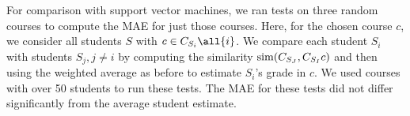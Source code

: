 For comparison with support vector machines, we ran tests on three random courses to compute the MAE for just those courses.  Here, for the chosen course $c$, we consider all students $S$ with $c \in C_{S_i} \all{i}$.  We compare each student $S_i$ with students $S_j, j \neq i$ by computing the similarity $\textrm{sim}(C_{S_J}, C_{S_I} \\ c)$ and then using the weighted average as before to estimate $S_i$'s grade in $c$.  We used courses with over 50 students to run these tests.  The MAE for these tests did not differ significantly from the average student estimate.
